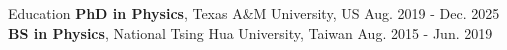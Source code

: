 \documentclass{resume}
\begin{document}
\vspace{-1em}

\begin{rSection}{Education}
    \vspace{-0.25em}
    {\bf PhD in Physics}, Texas A\&M University, US \hfill {Aug. 2019 - Dec. 2025} \\
    {\bf BS in Physics}, National Tsing Hua University, Taiwan \hfill {Aug. 2015 - Jun. 2019}
\end{rSection}


\end{document}
